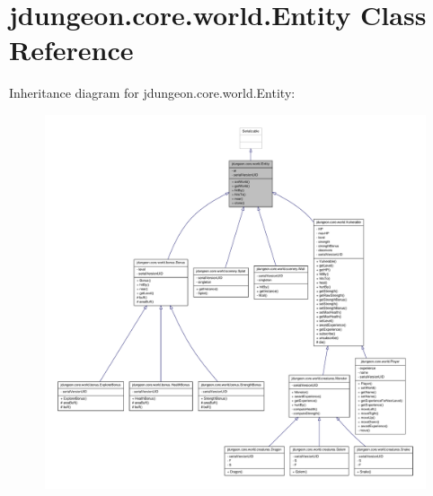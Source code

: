 \hypertarget{classjdungeon_1_1core_1_1world_1_1_entity}{
\section{jdungeon.core.world.Entity Class Reference}
\label{classjdungeon_1_1core_1_1world_1_1_entity}
}


Inheritance diagram for jdungeon.core.world.Entity:
\nopagebreak
\begin{figure}[H]
\begin{center}
\leavevmode
\includegraphics[width=400pt]{classjdungeon_1_1core_1_1world_1_1_entity__inherit__graph}
\end{center}
\end{figure}


